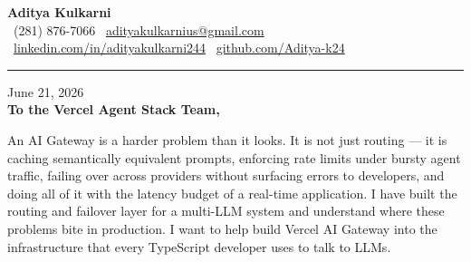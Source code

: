 \documentclass[11pt,letterpaper]{article}
\begin{document}
\begin{center}
    {\Huge \textbf{\color{VercelBlack} Aditya Kulkarni}}\\[8pt]
    {\color{DarkGrey} \small
    \faPhone \ (281) 876-7066 \quad \textbar \quad
    \faEnvelope \ \href{mailto:adityakulkarnius@gmail.com}{adityakulkarnius@gmail.com} \\[4pt]
    \faLinkedin \ \href{https://linkedin.com/in/adityakulkarni244}{linkedin.com/in/adityakulkarni244} \quad \textbar \quad
    \faGithub \ \href{https://github.com/Aditya-k24}{github.com/Aditya-k24}
    }
\end{center}
\vspace{-4pt}
{\color{VercelBlack}\rule{\linewidth}{1.5pt}}
\vspace{10pt}

June 21, 2026\\[10pt]
\textbf{To the Vercel Agent Stack Team,}

\vspace{6pt}

An AI Gateway is a harder problem than it looks. It is not just routing --- it is caching semantically equivalent prompts, enforcing rate limits under bursty agent traffic, failing over across providers without surfacing errors to developers, and doing all of it with the latency budget of a real-time application. I have built the routing and failover layer for a multi-LLM system and understand where these problems bite in production. I want to help build Vercel AI Gateway into the infrastructure that every TypeScript developer uses to talk to LLMs.
\end{document}
